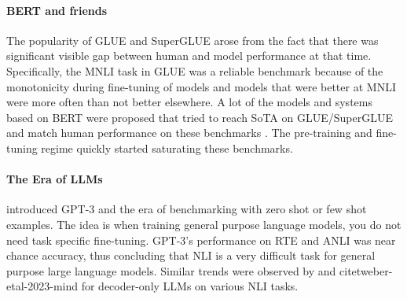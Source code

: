 \paragraph{BERT and friends} The popularity of GLUE \citep{wang2019glue} and SuperGLUE \citep{wang2019superglue} arose from the fact that there was significant visible gap between human and model performance at that time. Specifically, the MNLI task in GLUE was a reliable benchmark because of the monotonicity during fine-tuning of models and models that were better at MNLI were more often than not better elsewhere. A lot of the models and systems based on BERT \citep{devlin2019bert} were proposed that tried to reach SoTA on GLUE/SuperGLUE and match human performance on these benchmarks \citep{he2021deberta,he2021debertav3,patra2022englishcentric}. The pre-training and fine-tuning regime quickly started saturating these benchmarks.

\paragraph{The Era of LLMs} \citet{brown2020language} introduced GPT-3 and the era of benchmarking with zero shot or few shot examples. The idea is when training general purpose language models, you do not need task specific fine-tuning. GPT-3's performance on RTE and ANLI was near chance accuracy, thus concluding that NLI is a very difficult task for general purpose large language models. Similar trends were observed by \citet{ohmer2024form} and citet{weber-etal-2023-mind} for decoder-only LLMs on various NLI tasks.

